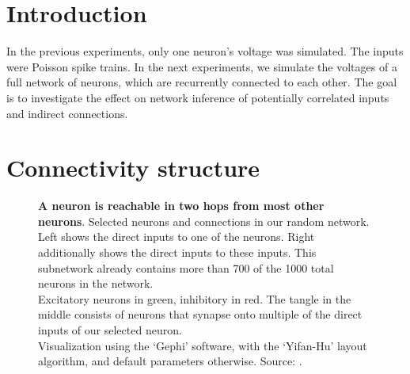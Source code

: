 
\section{Introduction}

In the previous experiments, only one neuron's voltage was simulated. The inputs were Poisson spike trains.
In the next experiments, we simulate the voltages of a full network of neurons, which are recurrently connected to each other.
The goal is to investigate the effect on network inference of potentially correlated inputs and indirect connections.




\section{Connectivity structure}

\begin{figure}
    \vspace*{2em}
    \caption
        {\textbf{A neuron is reachable in two hops from most other neurons}.    Selected neurons and connections in our random network. Left shows the direct inputs to one of the neurons. Right additionally shows the direct inputs to these inputs. This subnetwork already contains more than 700 of the 1000 total neurons in the network.\\
        Excitatory neurons in green, inhibitory in red. The tangle in the middle consists of neurons that synapse onto multiple of the direct inputs of our selected neuron.\\
        Visualization using the `Gephi' software, with the `Yifan-Hu' layout algorithm, and default parameters otherwise.
        Source: .}
    \label{fig:gephi-network-viz}
\end{figure}

